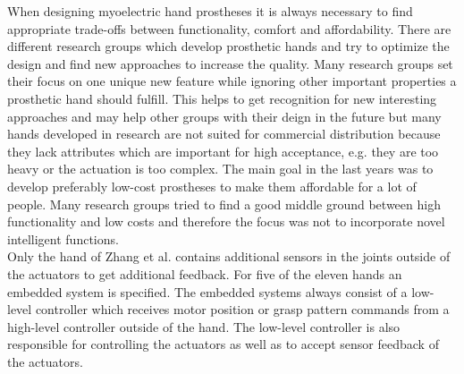 \documentclass[a4paper, 10pt, conference]{ieeeconf}      %
\begin{document}
When designing myoelectric hand prostheses it is always necessary to find appropriate trade-offs between functionality, comfort and affordability. There are different research groups which develop prosthetic hands and try to optimize the design and find new approaches to increase the quality. Many research groups set their focus on one unique new feature while ignoring other important properties a prosthetic hand should fulfill. This helps to get recognition for new interesting approaches and may help other groups with their deign in the future but many hands developed in research are not suited for commercial distribution because they lack attributes which are important for high acceptance, e.g. they are too heavy or the actuation is too complex. The main goal in the last years was to develop preferably low-cost prostheses to make them affordable for a lot of people. Many research groups tried to find a good middle ground between high functionality and low costs and therefore the focus was not to incorporate novel intelligent functions.\\
Only the hand of Zhang et al. contains additional sensors in the joints outside of the actuators to get additional feedback. For five of the eleven hands an embedded system is specified. The embedded systems always consist of a low-level controller which receives motor position or grasp pattern commands from a high-level controller outside of the hand. The low-level controller is also responsible for controlling the actuators as well as to accept sensor feedback of the actuators.

\newpage



%
\end{document}
